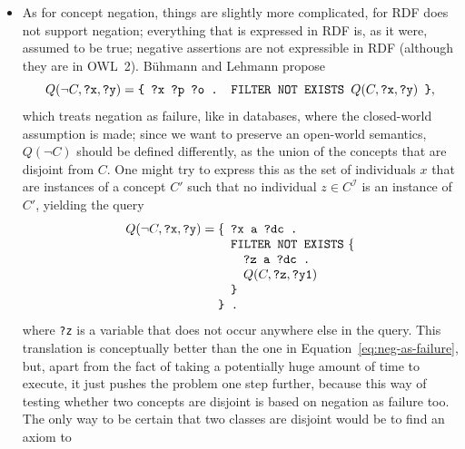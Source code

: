 \documentclass[a4paper]{article}
\newcounter{ex}
\begin{document}
\begin{itemize}
\item As for concept negation, things are slightly more complicated, for RDF does not support
  negation; everything that is expressed in RDF is, as it were, assumed to be true;
  negative assertions are not expressible in RDF (although they are in OWL~2).
  B\"uhmann and Lehmann propose
  \begin{equation}\label{eq:neg-as-failure}
    Q(\neg C, \mbox{\tt ?x}, \mbox{\tt ?y}) =
      \mbox{\tt \{ ?x ?p ?o . FILTER NOT EXISTS } Q(C, \mbox{\tt ?x}, \mbox{\tt ?y}) \mbox{\tt\ \}},
  \end{equation}
  which treats negation as failure, like in databases, where the closed-world assumption
  is made; 
  since we want to preserve an open-world semantics, $Q(\neg C)$ should be defined
  differently, as the union of the concepts that are disjoint from $C$.
  One might try to express this as the set of individuals $x$ that are instances of a
  concept $C'$ such that no individual $z\in C^\mathcal{I}$ is an instance of $C'$,
  yielding the query
  \begin{equation}\label{eq:approx-open-world-negation}
    Q(\neg C, \mbox{\tt ?x}, \mbox{\tt ?y}) =
    \begin{minipage}[t]{5in}
      \begin{tabbing}
        \quad\=\quad\=\quad\=\kill
        \{\>\texttt{?x a ?dc .}\\
        \>\texttt{FILTER NOT EXISTS} \{\\
        \>\>\texttt{?z a ?dc . }\\
        \>\>$Q(C, \mbox{\tt ?z}, \mbox{\tt ?y1})$\\
        \>\texttt{\}}\\
        \texttt{\} .}
      \end{tabbing}
    \end{minipage}
  \end{equation}
  where \texttt{?z} is a variable that does not occur anywhere else in the query.
  This translation is conceptually better than the one in Equation~\ref{eq:neg-as-failure}, 
  but, apart from the fact of taking a potentially huge amount of time to execute,
  it just pushes the problem one step further, because this way of testing whether
  two concepts are disjoint is based on negation as failure too.
  The only way to be certain that two classes are disjoint would be to find an axiom to

\end{itemize}
\end{document}
